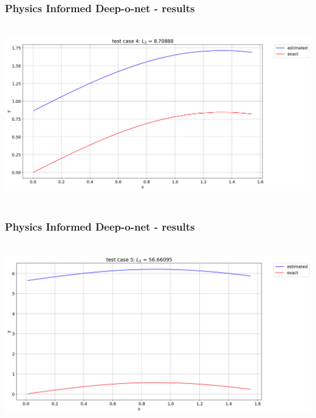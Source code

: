 \begin{frame}
    \frametitle{Physics Informed Deep-o-net - results}
    \hbox{\hspace{-1cm}
        \includegraphics[scale=0.32]{supportingFiles/PI_DON_results/01_originalOutput/test_case_4.png}\hspace{5cm}
    }
\end{frame}

\begin{frame}
    \frametitle{Physics Informed Deep-o-net - results}
    \hbox{\hspace{-1cm}
        \includegraphics[scale=0.32]{supportingFiles/PI_DON_results/01_originalOutput/test_case_5.png}\hspace{5cm}
    }
\end{frame}

